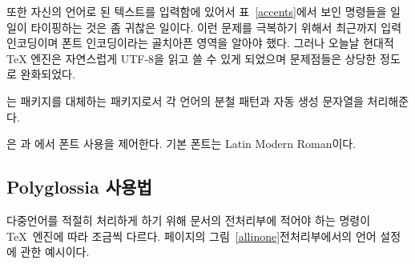 또한 자신의 언어로 된 텍스트를 입력함에 있어서 표~\ref{accents}에서 보인 명령들을 일일이 타이핑하는 것은 좀 귀찮은 일이다.
이런 문제를 극복하기 위해서 최근까지 입력 인코딩이며 폰트 인코딩이라는 골치아픈 영역을 알아야 했다.
그러나 오늘날 현대적 \TeX{} 엔진은 자연스럽게 UTF-8을 읽고 쓸 수 있게 되었으며 문제점들은 상당한 정도로 완화되었다.

\cite{polyglossia}는  패키지를 대체하는 패키지로서 각 언어의 분철 패턴과 자동 생성 문자열을 
처리해준다.

\cite{fontspec}은 과 에서 폰트 사용을 제어한다.
기본 폰트는 Latin Modern Roman이다.

\subsection{Polyglossia 사용법}

다중언어를 적절히 처리하게 하기 위해 문서의 전처리부에 적어야 하는 명령이 \TeX\ 엔진에 따라 조금씩 다르다.
\pageref{allinone}페이지의 그림~\ref{allinone}\은 전처리부에서의 언어 설정에 관한 예시이다.

